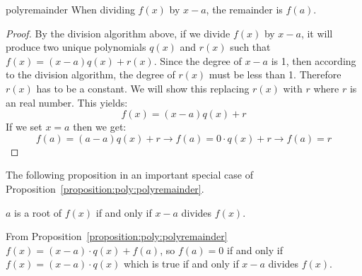 \begin {prop}{polyremainder}
When dividing $f(x)$ by $x-a$, the remainder is $f(a)$.
\end {prop}

\begin {proof}
By the division algorithm above, if we divide $f(x)$ by $x-a$, it will produce two unique polynomials $q(x)$ and $r(x)$ such that $f(x) = (x-a)q(x) + r(x)$.  Since the degree of $x-a$ is 1, then according to the division algorithm, the degree of $r(x)$ must be less than 1.  Therefore $r(x)$ has to be a constant.  We will show this replacing $r(x)$ with $r$ where $r$ is an real number.  This yields:
\[f(x) = (x-a)q(x) + r\]
If we set $x=a$ then we get:
\[f(a) = (a-a)q(x) + r \rightarrow f(a) = 0 \cdot q(x) + r \rightarrow f(a) = r\]
\end {proof}

The following proposition in an important special case of Proposition~\ref{proposition:poly:polyremainder}.

\begin {prop}{}
$a$ is a root of $f(x)$ if and only if $x-a$ divides $f(x)$.
\end {prop}

From Proposition~\ref{proposition:poly:polyremainder} $f(x) = (x-a) \cdot q(x) + f(a)$, so $f(a) = 0$ if and only if $f(x)=(x-a) \cdot q(x)$ which is true if and only if $x-a$ divides $f(x)$.



